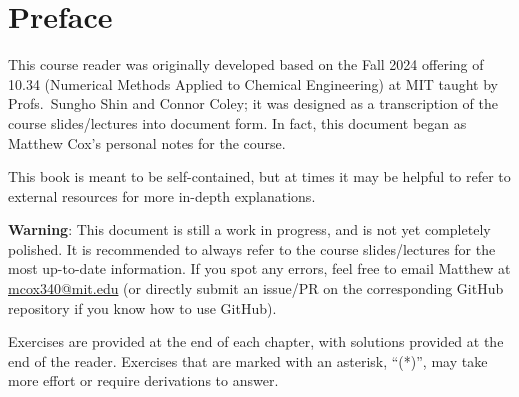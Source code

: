 \chapter*{Preface}
This course reader was originally developed based on the Fall 2024 offering of 10.34 (Numerical Methods Applied to Chemical Engineering) at MIT taught by Profs.\ Sungho Shin and Connor Coley; it was designed as a transcription of the course slides/lectures into document form. In fact, this document began as Matthew Cox's personal notes for the course. 

This book is meant to be self-contained, but at times it may be helpful to refer to external resources for more in-depth explanations.

\begin{warningBox}
    \textbf{Warning}: This document is still a work in progress, and is not yet completely polished. It is recommended to always refer to the course slides/lectures for the most up-to-date information. If you spot any errors, feel free to email Matthew at \href{mailto:mcox340@mit.edu}{mcox340@mit.edu} (or directly submit an issue/PR on the corresponding GitHub repository if you know how to use GitHub).
\end{warningBox}



Exercises are provided at the end of each chapter, with solutions provided at the end of the reader. Exercises that are marked with an asterisk, ``(*)'', may take more effort or require derivations to answer.

